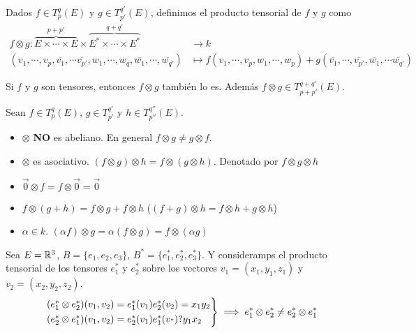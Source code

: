 \begin{defi}
	Dados $f \in T_p^q(E)$ y $g \in T_{p'}^{q'}(E)$, definimos el producto
	tensorial de $f$ y $g$ como
	\[
	\begin{aligned}
	f \otimes g \colon \overbrace{E \times \cdots \times E}^{p+p'}
	\times \overbrace{E^* \times \cdots \times E^*}^{q+q'} &\to k \\
	(v_1, \cdots, v_p, \overline{v_1}, \cdots \overline{v_{p'}},
	w_1, \cdots, w_q, \overline{w_1}, \cdots, \overline{w_{q'}})
	&\mapsto f(v_1, \cdots, v_p, w_1, \cdots, w_p) +
	g(\overline{v_1}, \cdots, \overline{v_{p'}}, \overline{w_1}, \cdots
	\overline{w_{q'}})
	\end{aligned}
	\]
\end{defi}
\begin{obs}
	Si $f$ y $g$ son tensores, entonces $f \otimes g$ también lo es. Además
	$f \otimes g \in T_{p+p'}^{q+q'}(E)$.
\end{obs}
\begin{prop}
	Sean  $f \in T_p^q(E)$, $g \in T_{p'}^{q'}$ y $h \in T_{p''}^{q''}(E)$.
	\begin{itemize}
		\item $\otimes$ {\bfseries NO} es abeliano. En general $f \otimes g \neq
		g \otimes f$.
		\item $\otimes$ es asociativo. $(f \otimes g) \otimes h = f \otimes (g
		\otimes h)$. Denotado por $f \otimes g \otimes h$
		\item $\vec{0} \otimes f = f \otimes \vec{0} = \vec{0}$
		\item $f \otimes (g + h) = f \otimes g + f\otimes h$ \quad ($(f+g) \otimes
		h = f \otimes h + g \otimes h$)
		\item $\alpha \in k$. $(\alpha f) \otimes g = \alpha(f \otimes g) =
		f \otimes (\alpha g)$
	\end{itemize}
\end{prop}
\begin{example}
	Sea $E = \mathbb{R}^3$, $B = \{e_1, e_2, e_3\}$, $B^* = \{ e_1^*, e_2^*, e_3^*\}$.
	Y consideramps el producto tensorial de los tensores $e_1^*$ y $e_2^*$ sobre
	los vectores $v_1 = (x_1, y_1, z_1)$ y $v_2 = (x_2,y_2,z_2)$.
	\[
	\begin{rcases}
	(e_1^* \otimes e_2^*)(v_1, v_2) = e_1^*(v_1)e_2^*(v_2) = x_1y_2 \\
	(e_2^* \otimes e_1^*)(v_1, v_2) = e_2^*(v_1)e_1^*(v_") ? y_1x_2
	\end{rcases}
	\implies e_1^* \otimes e_2^* \neq e_2^* \otimes e_1^*
	\]
\end{example}
